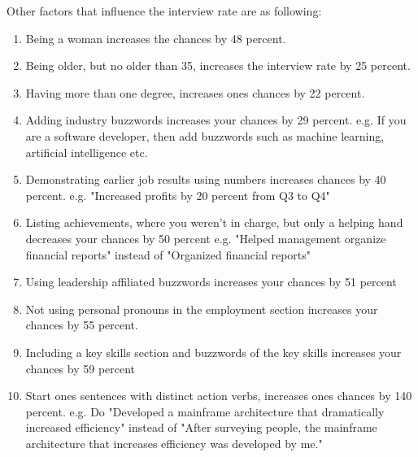 Other factors that influence the interview rate are as following:
\begin{enumerate}
\item Being a woman increases the chances by 48 percent.
\item Being older, but no older than 35, increases the interview rate by 25 percent.
\item Having more than one degree, increases ones chances by 22 percent.
\item Adding industry buzzwords increases your chances by 29 percent.
   e.g. If you are a software developer, then add buzzwords such as machine learning,
   artificial intelligence etc.
\item Demonstrating earlier job results using numbers increases chances by 40 percent.
   e.g. "Increased profits by 20 percent from Q3 to Q4"
\item Listing achievements, where you weren't in charge, but only a helping hand
 decreases your chances by 50 percent
   e.g. "Helped management organize financial reports" instead of "Organized financial reports"
\item Using leadership affiliated buzzwords increases your chances by 51 percent
\item Not using personal pronouns in the employment section increases your
chances by 55 percent.
\item Including a key skills section and buzzwords of the key skills increases your
 chances by 59 percent
\item Start ones sentences with distinct action verbs, increases ones chances by 140 percent.
   e.g. Do "Developed a mainframe architecture that dramatically increased efficiency"
   instead of "After surveying people, the mainframe architecture that increases efficiency was
   developed by me."\cite{Science_job}
\end{enumerate}






